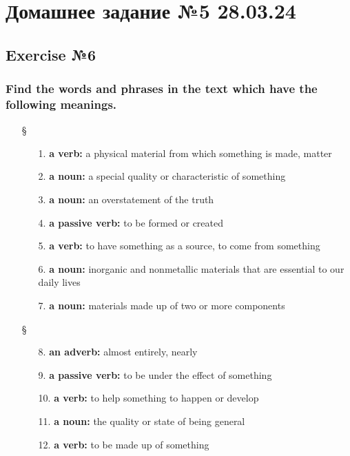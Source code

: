 \chapter{Домашнее задание №5 28.03.24}

\section{Exercise №6}

\subsection*{Find the words and phrases in the text which have the following meanings.}
\begin{enumerate}
      \item[§] 
            \begin{enumerate}
                  \item[1.] \textbf{a verb:} a physical material from which something is made, matter
                  \item[2.] \textbf{a noun:} a special quality or characteristic of something
                  \item[3.] \textbf{a noun:} an overstatement of the truth
                  \item[4.] \textbf{a passive verb:} to be formed or created
                  \item[5.] \textbf{a verb:} to have something as a source, to come from something
                  \item[6.] \textbf{a noun:} inorganic and nonmetallic materials that are essential to our daily lives
                  \item[7.] \textbf{a noun:} materials made up of two or more components
            \end{enumerate}
      \item[§] 
            \begin{enumerate}
                  \item[8.] \textbf{an adverb:} almost entirely, nearly
                  \item[9.] \textbf{a passive verb:} to be under the effect of something
                  \item[10.] \textbf{a verb:} to help something to happen or develop
                  \item[11.] \textbf{a noun:} the quality or state of being general
                  \item[12.] \textbf{a verb:} to be made up of something

\end{enumerate}
\end{enumerate}
